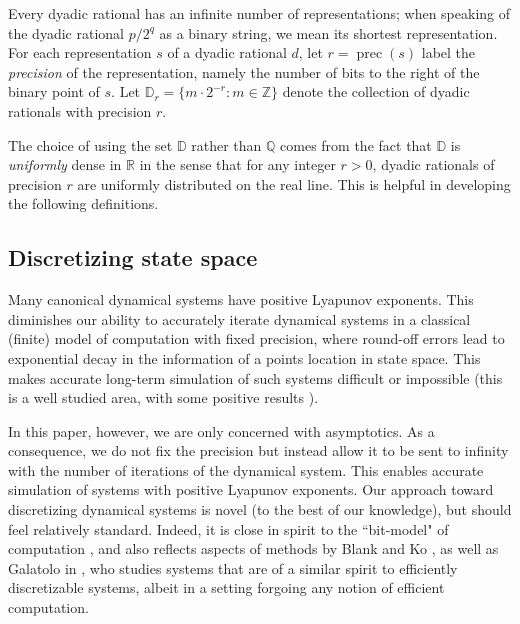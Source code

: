 \documentclass{amsart}
\theoremstyle{theorem}
\theoremstyle{remark}
\numberwithin{equation}{section}
\DeclareMathOperator{\precision}{prec} %
\newcommand{\DD}{\mathbb{D}}
\newcommand{\QQ}{\mathbb{Q}}
\newcommand{\RR}{\mathbb{R}}
\newcommand{\ZZ}{\mathbb{Z}}
\begin{document}
Every dyadic rational has an infinite number of representations; when speaking of the dyadic rational $p/2^q$ as a binary string, we mean its shortest representation.
For each representation $s$ of a dyadic rational $d$, let $r = \precision(s)$ label the \emph{precision} of the representation, namely the number of bits to the right of the binary point of $s$. Let $\DD_r = \{m \cdot 2^{-r} : m \in \ZZ\}$ denote the collection of dyadic rationals with precision $r$.

The choice of using the set $\DD$ rather than $\QQ$ comes from the fact that $\DD$ is \emph{uniformly} dense in $\RR$ in the sense that for any integer $r>0$, dyadic rationals of precision $r$ are uniformly distributed on the real line. This is helpful in developing the following definitions.

\subsection{Discretizing state space}

Many canonical dynamical systems have positive Lyapunov exponents.
This diminishes our ability to accurately iterate dynamical systems in a classical (finite) model of computation with fixed precision, where round-off errors lead to exponential decay in the information of a points location in state space. This makes accurate long-term simulation of such systems difficult or impossible (this is a well studied area, with some positive results \cite{gora1988computers}).

In this paper, however, we are only concerned with asymptotics. As a consequence, we do not fix the precision but instead allow it to be sent to infinity with the number of iterations of the dynamical system. This enables accurate simulation of systems with positive Lyapunov exponents.
Our approach toward discretizing dynamical systems is novel (to the best of our knowledge), but should feel relatively standard. Indeed, it is close in spirit to the ``bit-model" of computation \cite{braverman2006computing}, and also reflects aspects of methods by Blank \cite{blank1997discreteness} and Ko \cite{ko2012complexity}, as well as Galatolo in \cite{galatolo2003complexity}, who studies systems that are of a similar spirit to efficiently discretizable systems, albeit in a setting forgoing any notion of efficient computation.
\end{document}
